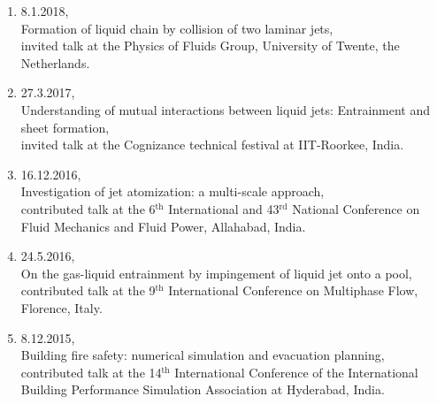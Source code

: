 \documentclass[11pt,a4paper,roman,english,colorlinks,linkcolor={red!50!black}]{moderncv}
\begin{document}
\begin{enumerate}[leftmargin=0.75cm]
	\item 8.1.2018,\\
	Formation of liquid chain by collision of two laminar jets,\\
	invited talk at the Physics of Fluids Group, University of Twente, the Netherlands.

	\item 27.3.2017,\\
	Understanding of mutual interactions between liquid jets: Entrainment and sheet formation,\\
	invited talk at the Cognizance technical festival at IIT-Roorkee, India.


	\item 16.12.2016,\\
	Investigation of jet atomization: a multi-scale approach,\\
	contributed talk at the 6$^\text{th}$ International and 43$^\text{rd}$ National Conference on Fluid Mechanics and Fluid Power, Allahabad, India.

	\item 24.5.2016,\\
	On the gas-liquid entrainment by impingement of liquid jet onto a pool,\\
	contributed talk at the 9$^\text{th}$ International Conference on Multiphase Flow, Florence, Italy.

	\item 8.12.2015,\\
	Building fire safety: numerical simulation and evacuation planning,\\
	contributed talk at the 14$^\text{th}$ International Conference of the International Building Performance Simulation Association at Hyderabad, India.
\end{enumerate}
\end{document}
